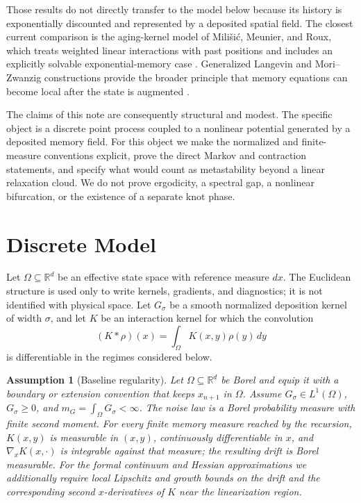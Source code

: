 \documentclass[preprint,amsmath,amssymb,aps,prd,nofootinbib,floatfix]{revtex4-2}
\newtheorem{assumption}{Assumption}
\begin{document}
Those results do not directly transfer to the model below because its history
is exponentially discounted and represented by a deposited spatial field.
The closest current comparison is the aging-kernel model of Mili\v{s}i\'c,
Meunier, and Roux, which treats weighted linear interactions with past
positions and includes an explicitly solvable exponential-memory case
\cite{MilisicMeunierRoux2026}.
Generalized Langevin and Mori--Zwanzig constructions provide the broader
principle that memory equations can become local after the state is augmented
\cite{Mori1965,Zwanzig2001,JaganathanValani2025}.

The claims of this note are consequently structural and modest.
The specific object is a discrete point process coupled to a nonlinear
potential generated by a deposited memory field.
For this object we make the normalized and finite-measure conventions
explicit, prove the direct Markov and contraction statements, and specify what
would count as metastability beyond a linear relaxation cloud.
We do not prove ergodicity, a spectral gap, a nonlinear bifurcation, or the
existence of a separate knot phase.
\section{Discrete Model}

Let $\Omega\subseteq\mathbb{R}^d$ be an effective state space with reference
measure $dx$. The Euclidean structure is used only to write kernels,
gradients, and diagnostics; it is not identified with physical space. Let
$G_\sigma$ be a smooth normalized deposition kernel of width $\sigma$, and
let $K$ be an interaction kernel for which the convolution
\[
(K*\rho)(x)=\int_\Omega K(x,y)\rho(y)\,dy
\]
is differentiable in the regimes considered below.

\begin{assumption}[Baseline regularity]
Let $\Omega\subseteq\mathbb{R}^d$ be Borel and equip it with a boundary or
extension convention that keeps $x_{n+1}$ in $\Omega$.
Assume $G_\sigma\in L^1(\Omega)$, $G_\sigma\geq0$, and
$m_G=\int_\Omega G_\sigma<\infty$.
The noise law is a Borel probability measure with finite second moment.
For every finite memory measure reached by the recursion,
$K(x,y)$ is measurable in $(x,y)$, continuously differentiable in $x$, and
$\nabla_xK(x,\cdot)$ is integrable against that measure; the resulting drift
is Borel measurable.
For the formal continuum and Hessian approximations we additionally require
local Lipschitz and growth bounds on the drift and the corresponding second
$x$-derivatives of $K$ near the linearization region.
\end{assumption}
\end{document}
